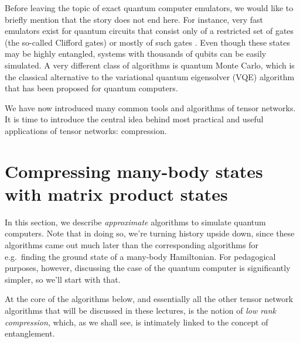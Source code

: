 \documentclass{SciPost}
\begin{document}
Before leaving the topic of exact quantum computer emulators, we would like to briefly mention that the story does not end here. For instance, very fast emulators exist for
quantum circuits that consist only of a restricted set of gates (the so-called Clifford gates) or mostly of such gates \cite{aaronson2004}. Even though these states may be highly entangled, systems with thousands of qubits can be easily simulated. A very different class of algorithms is quantum Monte Carlo, which is the classical alternative to the variational quantum eigensolver (VQE) algorithm that has been proposed for quantum computers.

We have now introduced many common tools and algorithms of tensor networks. It is time to introduce the central idea behind most practical and useful applications of tensor networks: compression.

\section{Compressing many-body states with matrix product states}
\label{sec:mps}

In this section, we describe \emph{approximate} algorithms to simulate quantum computers.
Note that in doing so, we're turning history upside down, since these algorithms came out
much later than the corresponding algorithms for e.g.\ finding the ground state of a many-body Hamiltonian.
For pedagogical purposes, however, discussing the case of the quantum computer is significantly
simpler, so we'll start with that.

At the core of the algorithms below, and essentially all the other tensor network algorithms that will be discussed in these lectures, is the notion of \emph{low rank compression}, which, as we shall see, is intimately linked to the concept of entanglement.
\end{document}
